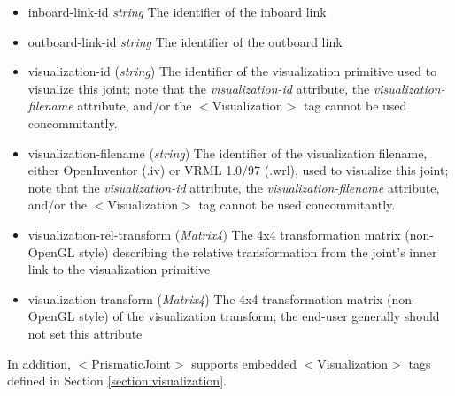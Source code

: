 \documentclass{article}
\begin{document}
\begin{landscape}
\begin{itemize}
\begin{itemize}
\item inboard-link-id  \emph{string} The identifier of the inboard link
\item outboard-link-id  \emph{string} The identifier of the outboard link
\item visualization-id (\emph{string})  The identifier of the visualization primitive used to visualize this joint; note that the \emph{visualization-id} attribute, the \emph{visualization-filename} attribute, and/or the $<$Visualization$>$ tag cannot be used concommitantly.
\item visualization-filename (\emph{string})  The identifier of the visualization filename, either OpenInventor (.iv) or VRML 1.0/97 (.wrl), used to visualize this joint; note that the \emph{visualization-id} attribute, the \emph{visualization-filename} attribute, and/or the $<$Visualization$>$ tag cannot be used concommitantly.
\item visualization-rel-transform (\emph{Matrix4})  The 4x4 transformation matrix (non-OpenGL style) describing the relative transformation from the joint's inner link to the visualization primitive
\item visualization-transform (\emph{Matrix4})  The 4x4 transformation matrix (non-OpenGL style) of the visualization transform; the end-user generally should not set this attribute
\end{itemize}

In addition, $<$PrismaticJoint$>$ supports embedded $<$Visualization$>$ tags defined in Section \ref{section:visualization}.


\end{itemize}
\end{landscape}
\end{document}
